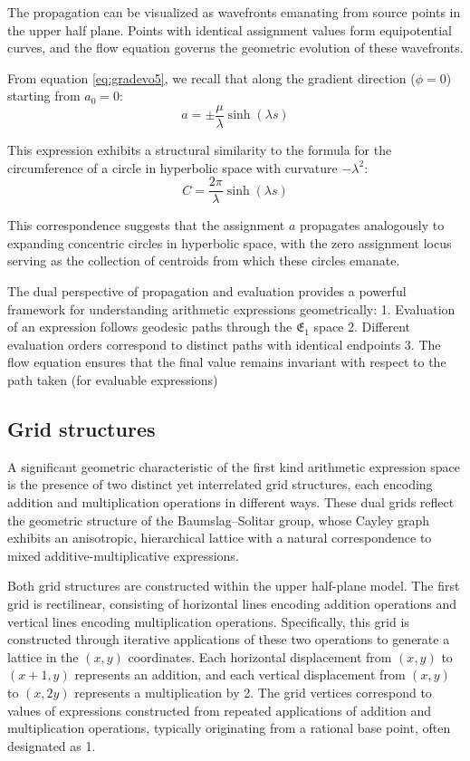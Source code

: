 The propagation can be visualized as wavefronts emanating from source points in the upper half plane. Points with identical assignment values form equipotential curves, and the flow equation governs the geometric evolution of these wavefronts.

From equation \eqref{eq:gradevo5}, we recall that along the gradient direction ($\phi=0$) starting from $a_0=0$:
\begin{equation}
a = \pm \frac{\mu}{\lambda} \sinh(\lambda s)
\end{equation}

This expression exhibits a structural similarity to the formula for the circumference of a circle in hyperbolic space with curvature $-\lambda^2$:
\begin{equation}
C = \frac{2\pi}{\lambda} \sinh(\lambda s)
\end{equation}

This correspondence suggests that the assignment $a$ propagates analogously to expanding concentric circles in hyperbolic space, with the zero assignment locus serving as the collection of centroids from which these circles emanate.

The dual perspective of propagation and evaluation provides a powerful framework for understanding arithmetic expressions geometrically:
1. Evaluation of an expression follows geodesic paths through the $\mathfrak{E}_1$ space
2. Different evaluation orders correspond to distinct paths with identical endpoints
3. The flow equation ensures that the final value remains invariant with respect to the path taken (for evaluable expressions)

\subsection{Grid structures}\label{subsec:grids}

A significant geometric characteristic of the first kind arithmetic expression space is the presence of two distinct yet interrelated grid structures, each encoding addition and multiplication operations in different ways. These dual grids reflect the geometric structure of the Baumslag–Solitar group, whose Cayley graph exhibits an anisotropic, hierarchical lattice with a natural correspondence to mixed additive-multiplicative expressions.

Both grid structures are constructed within the upper half-plane model. The first grid is rectilinear, consisting of horizontal lines encoding addition operations and vertical lines encoding multiplication operations. Specifically, this grid is constructed through iterative applications of these two operations to generate a lattice in the $(x,y)$ coordinates. Each horizontal displacement from $(x,y)$ to $(x+1,y)$ represents an addition, and each vertical displacement from $(x,y)$ to $(x,2y)$ represents a multiplication by 2. The grid vertices correspond to values of expressions constructed from repeated applications of addition and multiplication operations, typically originating from a rational base point, often designated as 1.

